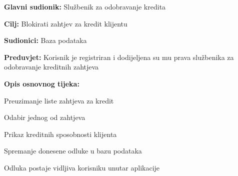                     \noindent {}
                    \begin{packed_item}
                    
                      \item \textbf{Glavni sudionik: } Službenik za odobravanje kredita
                      \item  \textbf{Cilj:} Blokirati zahtjev za kredit klijentu
                      \item  \textbf{Sudionici:} Baza podataka
                      \item  \textbf{Preduvjet:} Korisnik je registriran i dodijeljena su mu prava službenika za odobravanje kreditnih zahtjeva 
                      \item  \textbf{Opis osnovnog tijeka:}
                      
                      \item[] \begin{packed_enum}
                    
                    \item Preuzimanje liste zahtjeva za kredit
                    \item Odabir jednog od zahtjeva 
                    \item Prikaz kreditnih sposobnosti klijenta
                    \item Spremanje donesene odluke u bazu podataka
                    \item Odluka postaje vidljiva korisniku unutar aplikacije
                    
                  \end{packed_enum}
                \end{packed_item}
                
